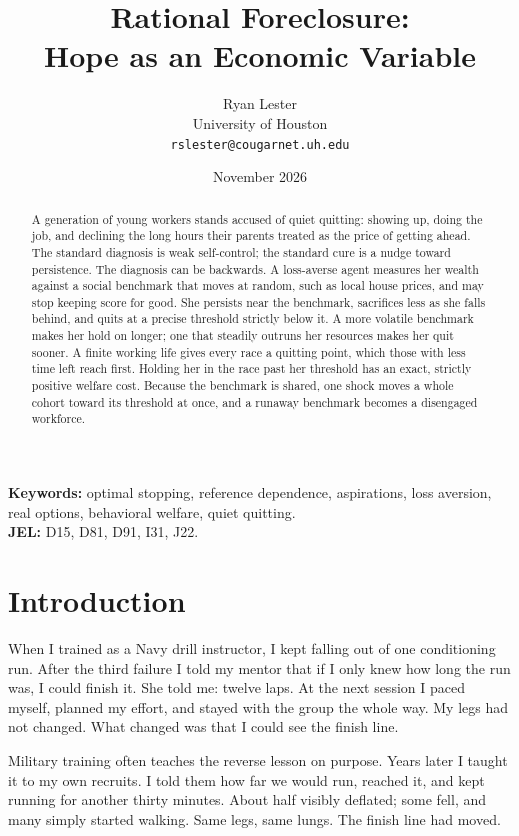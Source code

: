 \documentclass[12pt]{article}
\title{Rational Foreclosure:\\[2pt] \Large Hope as an Economic Variable}
\author{Ryan Lester\\[2pt] \normalsize University of Houston\\ \normalsize\texttt{rslester@cougarnet.uh.edu}}
\date{November 2026}
\theoremstyle{definition}
\theoremstyle{remark}
\theoremstyle{plain}
\theoremstyle{definition}
\begin{document}
\maketitle
\thispagestyle{empty}

\begin{abstract}
\noindent A generation of young workers stands accused of quiet quitting: showing up, doing the job, and declining the long hours their parents treated as the price of getting ahead. The standard diagnosis is weak self-control; the standard cure is a nudge toward persistence. The diagnosis can be backwards. A loss-averse agent measures her wealth against a social benchmark that moves at random, such as local house prices, and may stop keeping score for good. She persists near the benchmark, sacrifices less as she falls behind, and quits at a precise threshold strictly below it. A more volatile benchmark makes her hold on longer; one that steadily outruns her resources makes her quit sooner. A finite working life gives every race a quitting point, which those with less time left reach first. Holding her in the race past her threshold has an exact, strictly positive welfare cost. Because the benchmark is shared, one shock moves a whole cohort toward its threshold at once, and a runaway benchmark becomes a disengaged workforce.
\end{abstract}

\noindent\textbf{Keywords:} optimal stopping, reference dependence, aspirations, loss aversion, real options, behavioral welfare, quiet quitting.\\
\textbf{JEL:} D15, D81, D91, I31, J22.

\newpage
\setcounter{page}{1}

\section{Introduction}\label{sec:intro}

When I trained as a Navy drill instructor, I kept falling out of one conditioning run. After the third failure I told my mentor that if I only knew how long the run was, I could finish it. She told me: twelve laps. At the next session I paced myself, planned my effort, and stayed with the group the whole way. My legs had not changed. What changed was that I could see the finish line.

Military training often teaches the reverse lesson on purpose. Years later I taught it to my own recruits. I told them how far we would run, reached it, and kept running for another thirty minutes. About half visibly deflated; some fell, and many simply started walking. Same legs, same lungs. The finish line had moved.
\end{document}
